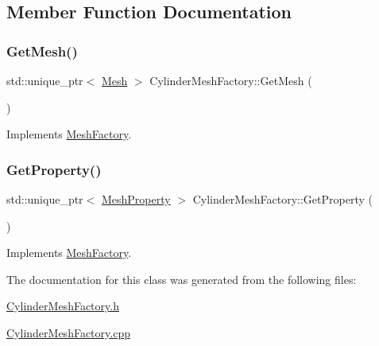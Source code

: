 \subsection{Member Function Documentation}
\mbox{\label{class_cylinder_mesh_factory_a6693199a1ec7dc082b56be29213b97d2}} 
\subsubsection{\texorpdfstring{GetMesh()}{GetMesh()}}
{\footnotesize\ttfamily std\+::unique\+\_\+ptr$<$ \mbox{\hyperlink{class_mesh}{Mesh}} $>$ Cylinder\+Mesh\+Factory\+::\+Get\+Mesh (\begin{DoxyParamCaption}{ }\end{DoxyParamCaption})\hspace{0.3cm}{\ttfamily [virtual]}}



Implements \mbox{\hyperlink{class_mesh_factory_a4cc58b609d0f4f5209cf5245e16f0720}{Mesh\+Factory}}.

\mbox{\label{class_cylinder_mesh_factory_a3fa17fc0e14db4007c9c2a6cdeb1d8fa}} 
\subsubsection{\texorpdfstring{GetProperty()}{GetProperty()}}
{\footnotesize\ttfamily std\+::unique\+\_\+ptr$<$ \mbox{\hyperlink{class_mesh_property}{Mesh\+Property}} $>$ Cylinder\+Mesh\+Factory\+::\+Get\+Property (\begin{DoxyParamCaption}{ }\end{DoxyParamCaption})\hspace{0.3cm}{\ttfamily [virtual]}}



Implements \mbox{\hyperlink{class_mesh_factory_abff50d215458843dd98271ab803a7671}{Mesh\+Factory}}.



The documentation for this class was generated from the following files\+:\begin{DoxyCompactItemize}
\item 
\mbox{\hyperlink{_cylinder_mesh_factory_8h}{Cylinder\+Mesh\+Factory.\+h}}\item 
\mbox{\hyperlink{_cylinder_mesh_factory_8cpp}{Cylinder\+Mesh\+Factory.\+cpp}}\end{DoxyCompactItemize}
